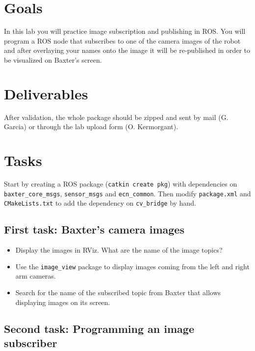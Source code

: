 \documentclass{ecnreport}
\author{G. Garcia, O. Kermorgant}
\begin{document}


\section{Goals}

In this lab you will practice image subscription and publishing in ROS. You will program a ROS node that subscribes to one 
of the camera images of the robot and after overlaying your names onto the image it will be re-published in order to be visualized
on Baxter's screen.

\section{Deliverables}

After validation, the whole package should be zipped and sent by mail (G. Garcia) or through the lab upload form (O. Kermorgant).

\section{Tasks}

Start by creating a ROS package (\texttt{catkin create pkg}) with dependencies on \texttt{baxter\_core\_msgs}, 
 \texttt{sensor\_msgs} and \texttt{ecn\_common}.
 Then modify \texttt{package.xml} and \texttt{CMakeLists.txt} to add the dependency on \texttt{cv\_bridge} by hand. 

\subsection{First task: Baxter's camera images}

\begin{itemize}
\item Display the images in RViz. What are the name of the image topics?
 \item Use the \texttt{image\_view} package to display images coming from the left and right arm cameras. 
 \item Search for the name of the subscribed topic from Baxter that allows displaying images on its screen.
\end{itemize}

\subsection{Second task: Programming an image subscriber}
\end{document}
